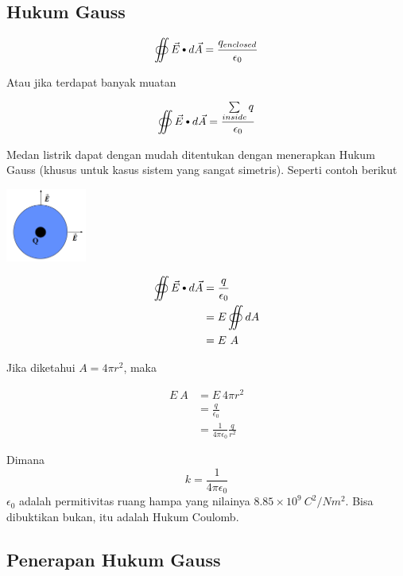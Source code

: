 \documentclass[twocolumn, 11pt]{article}%
\newcommand\sbullet[1][.5]{\mathbin{\ThisStyle{\vcenter{\hbox{%
  \scalebox{#1}{$\SavedStyle\bullet$}}}}}%
}
\begin{document}
    \subsection{Hukum Gauss}%
    
    \[ \oiint \vec E \sbullet[.75] d \vec A = \frac{q_{enclosed}}{\epsilon_0} \]

    Atau jika terdapat banyak muatan
    
    \[ \oiint \vec E \sbullet[.75] d \vec A = \frac{\sum\limits_{inside}q}{\epsilon_0} \]

    Medan listrik dapat dengan mudah ditentukan dengan menerapkan Hukum Gauss (khusus untuk kasus sistem yang sangat simetris). Seperti contoh berikut

    \begin{center}
        \includegraphics[width=100px]{10.png}
    \end{center}

    \begin{align*}
        \oiint \vec E \sbullet[.75] d\vec A &= \frac{q}{\epsilon_0}\\
                                &= E \oiint dA\\
                                &= E\ A\\
    \end{align*}
    
     Jika diketahui $A=4\pi r^2$, maka

    \begin{align*}
        E\ A &=E\ 4\pi r^2\\
             &= \frac{q}{\epsilon_0}\\
             &= \frac1{4\pi \epsilon_0} \frac{q}{r^2}
    \end{align*}
    
    Dimana
    \[ k=\frac1{4\pi \epsilon_0} \]
    $\epsilon_0$ adalah permitivitas ruang hampa yang nilainya $8.85 \times 10^9\ C^2/Nm^2$. Bisa dibuktikan bukan, itu adalah Hukum Coulomb.

    \subsection{Penerapan Hukum Gauss}%
\end{document}
